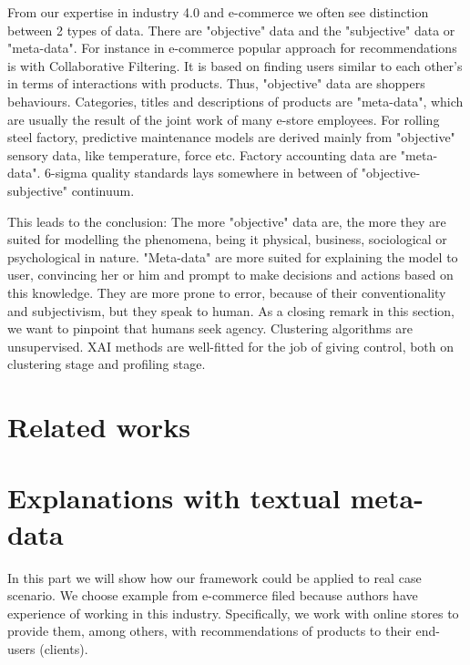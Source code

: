 \documentclass[
 twocolumn,
]{ceurart}
\begin{document}
From our expertise in industry 4.0 and e-commerce we often see distinction between 2 types of data.
There are "objective" data and the "subjective" data or "meta-data".
For instance in e-commerce popular approach for recommendations is with Collaborative Filtering.
It is based on finding users similar to each other's in terms of interactions with products.
Thus, "objective" data are shoppers behaviours.
Categories, titles and descriptions of products are "meta-data", which are usually the result of the joint work of many e-store employees.
For rolling steel factory, predictive maintenance models are derived mainly from "objective" sensory data, like temperature, force etc.
Factory accounting data are "meta-data".
6-sigma quality standards lays somewhere in between of "objective-subjective" continuum.

This leads to the conclusion:
The more "objective" data are, the more they are suited for modelling the phenomena, being it physical, business, sociological or psychological in nature.
"Meta-data" are more suited for explaining the model to user, convincing her or him and prompt to make decisions and actions based on this knowledge.
They are more prone to error, because of their conventionality and subjectivism, but they speak to human.
As a closing remark in this section, we want to pinpoint that humans seek agency.
Clustering algorithms are unsupervised.
XAI methods are well-fitted for the job of giving control, both on clustering stage and profiling stage.

\section{Related works}

\section{Explanations with textual meta-data}
In this part we will show how our framework could be applied to real case scenario.
We choose example from e-commerce filed because authors have experience of working in this industry.
Specifically, we work with online stores to provide them, among others, with recommendations of products to their end-users (clients).
\end{document}
